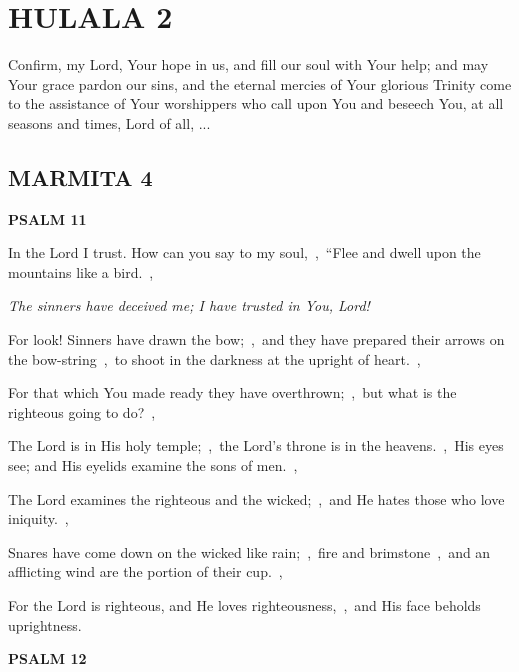 \documentclass[12pt,twoside,a5paper]{article}
\newcommand{\hulala}[1]{\section*{HULALA {#1}}}
\newcommand{\marmita}[1]{\subsection*{MARMITA {#1}}}
\newcommand{\psalm}[1]{\textbf{PSALM {#1}}\nopagebreak}
\newcommand{\qanona}[1]{{\liturgicalhint{Qanona.} \emph{#1}}}
\newcommand{\slota}[1]{\liturgicalhint{Slota.} #1}
\begin{document}

\hulala{2}

\slota{Confirm, my Lord, Your hope in us, and fill our soul with Your help; and may Your grace pardon our sins, and the eternal mercies of Your glorious Trinity come to the assistance of Your worshippers who call upon You and beseech You, at all seasons and times, Lord of all, ...}

\marmita{4}

\psalm{11}

\begin{normalparskip}
  In the Lord I trust. How can you say to my soul,~\sep\ ``Flee and dwell upon the mountains like a bird.~\sep

  \qanona{The sinners have deceived me; I have trusted in You, Lord!}

  For look! Sinners have drawn the bow;~\sep\ and they have prepared their arrows on the bow-string~\sep\ to shoot in the darkness at the upright of heart.~\sep

  For that which You made ready they have overthrown;~\sep\ but what is the righteous going to do?~\sep

  The Lord is in His holy temple;~\sep\ the Lord's throne is in the heavens.~\sep\ His eyes see; and His eyelids examine the sons of men.~\sep

  The Lord examines the righteous and the wicked;~\sep\ and He hates those who love iniquity.~\sep

  Snares have come down on the wicked like rain;~\sep\ fire and brimstone~\sep\ and an afflicting wind are the portion of their cup.~\sep

  For the Lord is righteous, and He loves righteousness,~\sep\ and His face beholds uprightness.
\end{normalparskip}

\psalm{12}
\end{document}
